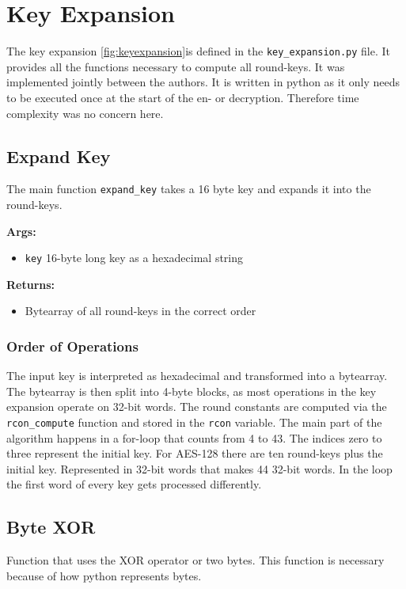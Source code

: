 \section{Key Expansion}
\label{ch:key_expansion}
The key expansion \ref{fig:keyexpansion}is defined in the \lstinline{key_expansion.py} file. It provides all the functions necessary to compute all round-keys. It was implemented jointly between the authors. It is written in python as it only needs to be executed once at the start of the en- or decryption. Therefore time complexity was no concern here.

\subsection{Expand Key}
\label{ch:expand_key}
The main function  \lstinline{expand_key} takes a 16 byte key and expands it into the round-keys.

\textbf{Args:}
\begin{itemize}
  \item \lstinline{key} 16-byte long key as a hexadecimal string
\end{itemize}

\textbf{Returns:}
\begin{itemize}
  \item Bytearray of all round-keys in the correct order
\end{itemize}

\subsubsection{Order of Operations}
The input key is interpreted as hexadecimal and transformed into a bytearray. The bytearray is then split into 4-byte blocks, as most operations in the key expansion operate on 32-bit words. The round constants are computed via the  \lstinline{rcon_compute} function and stored in the  \lstinline{rcon} variable. The main part of the algorithm happens in a for-loop that counts from 4 to 43. The indices zero to three represent the initial key. For AES-128 there are ten round-keys plus the initial key. Represented in 32-bit words that makes 44 32-bit words. In the loop the first word of every key gets processed differently.

\subsection{Byte XOR}
\label{ch:byte_xor}
Function that uses the XOR operator or two bytes. This function is necessary because of how python represents bytes.

